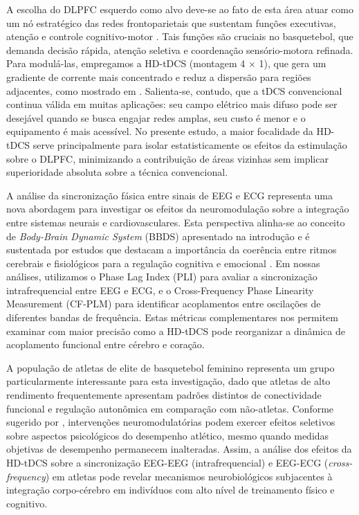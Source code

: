 A escolha do DLPFC esquerdo como alvo deve-se ao fato de esta área atuar como um nó estratégico das redes frontoparietais que sustentam funções executivas, atenção e controle cognitivo-motor \cite{dong2023efficacy,arif2021high,jones2017frontoparietal}. Tais funções são cruciais no basquetebol, que demanda decisão rápida, atenção seletiva e coordenação sensório-motora refinada. Para modulá-las, empregamos a HD-tDCS (montagem 4 × 1), que gera um gradiente de corrente mais concentrado e reduz a dispersão para regiões adjacentes, como mostrado em . Salienta-se, contudo, que a tDCS convencional continua válida em muitas aplicações: seu campo elétrico mais difuso pode ser desejável quando se busca engajar redes amplas, seu custo é menor e o equipamento é mais acessível. No presente estudo, a maior focalidade da HD-tDCS serve principalmente para isolar estatisticamente os efeitos da estimulação sobre o DLPFC, minimizando a contribuição de áreas vizinhas sem implicar superioridade absoluta sobre a técnica convencional.

A análise da sincronização fásica entre sinais de EEG e ECG representa uma nova abordagem para investigar os efeitos da neuromodulação sobre a integração entre sistemas neurais e cardiovasculares. Esta perspectiva alinha-se ao conceito de \textit{Body-Brain Dynamic System} (BBDS) apresentado na introdução e é sustentada por estudos que destacam a importância da coerência entre ritmos cerebrais e fisiológicos para a regulação cognitiva e emocional \cite{criscuolo2022cognition, vergara2024exploring}. Em nossas análises, utilizamos o Phase Lag Index (PLI) para avaliar a sincronização intrafrequencial entre EEG e ECG, e o Cross-Frequency Phase Linearity Measurement (CF-PLM) para identificar acoplamentos entre oscilações de diferentes bandas de frequência. Estas métricas complementares nos permitem examinar com maior precisão como a HD-tDCS pode reorganizar a dinâmica de acoplamento funcional entre cérebro e coração.

A população de atletas de elite de basquetebol feminino representa um grupo particularmente interessante para esta investigação, dado que atletas de alto rendimento frequentemente apresentam padrões distintos de conectividade funcional e regulação autonômica em comparação com não-atletas. Conforme sugerido por , intervenções neuromodulatórias podem exercer efeitos seletivos sobre aspectos psicológicos do desempenho atlético, mesmo quando medidas objetivas de desempenho permanecem inalteradas. Assim, a análise dos efeitos da HD-tDCS sobre a sincronização EEG-EEG (intrafrequencial) e EEG-ECG (\textit{cross-frequency}) em atletas pode revelar mecanismos neurobiológicos subjacentes à integração corpo-cérebro em indivíduos com alto nível de treinamento físico e cognitivo.


